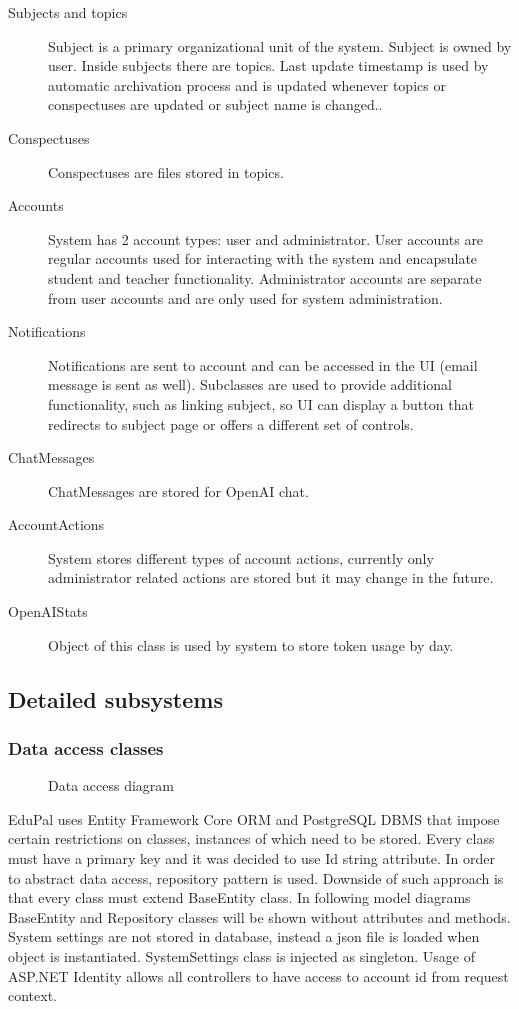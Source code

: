 \documentclass[
    english, %
]{VUMIFPSkursinis}
\begin{document}
\begin{description}
    \item[Subjects and topics] Subject is a primary organizational unit of the system. Subject is owned by user. Inside subjects there are topics. Last update timestamp is used by automatic archivation process and is updated whenever topics or conspectuses are updated or subject name is changed..
    \item[Conspectuses] Conspectuses are files stored in topics.
    \item[Accounts] System has 2 account types: user and administrator. User accounts are regular accounts used for interacting with the system and encapsulate student and teacher functionality. Administrator accounts are separate from user accounts and are only used for system administration.
    \item[Notifications] Notifications are sent to account and can be accessed in the UI (email message is sent as well). Subclasses are used to provide additional functionality, such as linking subject, so UI can display a button that redirects to subject page or offers a different set of controls.
    \item[ChatMessages] ChatMessages are stored for OpenAI chat.
    \item[AccountActions] System stores different types of account actions, currently only administrator related actions are stored but it may change in the future.
    \item[OpenAIStats] Object of this class is used by system to store token usage by day.
\end{description}

\subsection{Detailed subsystems}

\subsubsection{Data access classes}

\begin{figure}[ht]
    \centering
    
    \label{data-access-model}
    \caption{Data access diagram}
\end{figure}

EduPal uses Entity Framework Core ORM and PostgreSQL DBMS that impose certain restrictions on classes, instances of which need to be stored. Every class must have a primary key and it was decided to use Id string attribute. In order to abstract data access, repository pattern is used. Downside of such approach is that every class must extend BaseEntity class. In following model diagrams BaseEntity and Repository classes will be shown without attributes and methods. System settings are not stored in database, instead a json file is loaded when object is instantiated. SystemSettings class is injected as singleton. Usage of ASP.NET Identity allows all controllers to have access to account id from request context.
\end{document}
